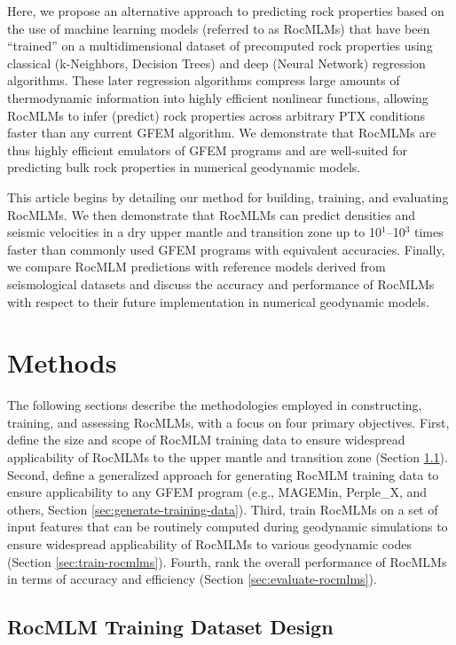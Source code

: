 \documentclass[draft,linenumbers]{agujournal2018}
\begin{document}
Here, we propose an alternative approach to predicting rock properties based on the use of machine learning models (referred to as RocMLMs) that have been ``trained'' on a multidimensional dataset of precomputed rock properties using classical (k-Neighbors, Decision Trees) and deep (Neural Network) regression algorithms. These later regression algorithms compress large amounts of thermodynamic information into highly efficient nonlinear functions, allowing RocMLMs to infer (predict) rock properties across arbitrary PTX conditions faster than any current GFEM algorithm. We demonstrate that RocMLMs are thus highly efficient emulators of GFEM programs and are well-suited for predicting bulk rock properties in numerical geodynamic models.

This article begins by detailing our method for building, training, and evaluating RocMLMs. We then demonstrate that RocMLMs can predict densities and seismic velocities in a dry upper mantle and transition zone up to 10\(^1\)--10\(^3\) times faster than commonly used GFEM programs with equivalent accuracies. Finally, we compare RocMLM predictions with reference models derived from seismological datasets \citep{dziewonski1981, kustowski2008} and discuss the accuracy and performance of RocMLMs with respect to their future implementation in numerical geodynamic models.

\section{Methods}\label{sec:methods}

The following sections describe the methodologies employed in constructing, training, and assessing RocMLMs, with a focus on four primary objectives. First, define the size and scope of RocMLM training data to ensure widespread applicability of RocMLMs to the upper mantle and transition zone (Section \ref{sec:training-data-design}). Second, define a generalized approach for generating RocMLM training data to ensure applicability to any GFEM program (e.g., MAGEMin, Perple\_X, and others, Section \ref{sec:generate-training-data}). Third, train RocMLMs on a set of input features that can be routinely computed during geodynamic simulations to ensure widespread applicability of RocMLMs to various geodynamic codes (Section \ref{sec:train-rocmlms}). Fourth, rank the overall performance of RocMLMs in terms of accuracy and efficiency (Section \ref{sec:evaluate-rocmlms}).

\subsection{RocMLM Training Dataset Design}\label{sec:training-data-design}
\end{document}
